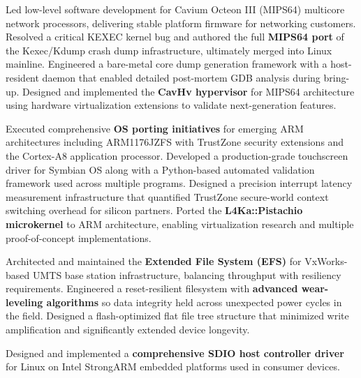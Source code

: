 \documentclass[12pt,a4paper]{pawesome-cv}
\begin{document}
\begin{cventries}
\begin{experiencecontent}
Led low-level software development for Cavium Octeon III (MIPS64) multicore network processors, delivering stable platform firmware for networking customers.
Resolved a critical KEXEC kernel bug and authored the full \textbf{MIPS64 port} of the Kexec/Kdump crash dump infrastructure, ultimately merged into Linux mainline.
Engineered a bare-metal core dump generation framework with a host-resident daemon that enabled detailed post-mortem GDB analysis during bring-up.
Designed and implemented the \textbf{CavHv hypervisor} for MIPS64 architecture using hardware virtualization extensions to validate next-generation features.\end{experiencecontent}
\begin{experiencecontent}
Executed comprehensive \textbf{OS porting initiatives} for emerging ARM architectures including ARM1176JZFS with TrustZone security extensions and the Cortex-A8 application processor.
Developed a production-grade touchscreen driver for Symbian OS along with a Python-based automated validation framework used across multiple programs.
Designed a precision interrupt latency measurement infrastructure that quantified TrustZone secure-world context switching overhead for silicon partners.
Ported the \textbf{L4Ka::Pistachio microkernel} to ARM architecture, enabling virtualization research and multiple proof-of-concept implementations.\end{experiencecontent}
\begin{experiencecontent}
Architected and maintained the \textbf{Extended File System (EFS)} for VxWorks-based UMTS base station infrastructure, balancing throughput with resiliency requirements.
Engineered a reset-resilient filesystem with \textbf{advanced wear-leveling algorithms} so data integrity held across unexpected power cycles in the field.
Designed a flash-optimized flat file tree structure that minimized write amplification and significantly extended device longevity.\end{experiencecontent}
\begin{experiencecontent}
Designed and implemented a \textbf{comprehensive SDIO host controller driver} for Linux on Intel StrongARM embedded platforms used in consumer devices.

\end{experiencecontent}
\end{cventries}
\end{document}
